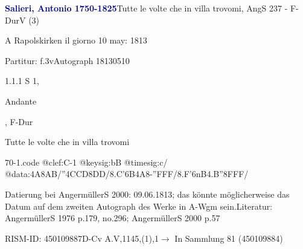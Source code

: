 \documentclass[a4paper, twocolumn, 11pt]{book}
\begin{document}
\par \vspace{16pt} \textcolor{darkblue}{\textbf{Salieri, Antonio  1750-1825}}\hfillplus{[70]}\newline Tutte le volte che in villa trovomi, AngS 237 - F-Dur\newline V (3)
\par \begin{itshape} A Rapolskirken il giorno 10 may: 1813\end{itshape} 
\par \textcolor{darkblue}{}  Partitur: f.3v\newline Autograph  18130510
\par 1.1.1  S 1, \begin{itshape}Andante\end{itshape}, F-Dur\newline \begin{footnotesize} Tutte le volte che in villa trovomi \end{footnotesize}  
\begin{filecontents*}{70-1.code}
@clef:C-1
@keysig:bB
@timesig:c/
@data:4A8AB/''4CCD8DD/8.C'6B4A8-''FFF/8.F'6nB4.B''8FFF/
\end{filecontents*}

\newline %
\par Datierung bei AngermüllerS 2000: 09.06.1813; das könnte möglicherweise das Datum auf dem zweiten Autograph des Werke in A-Wgm sein.\newline Literatur: AngermüllerS 1976  p.179, no.296; AngermüllerS 2000  p.57
\par RISM-ID: 450109887\newline D-Cv  A.V,1145,(1),1\newline $\rightarrow$ In Sammlung 81 (450109884)
      
\end{document}
